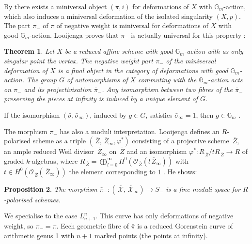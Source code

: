 \documentclass[12pt,a4paper]{amsart}  %
\newcommand{\G}{\mathbb{G}}
\newcommand{\vp}{\varphi}
\newcommand{\olsi}[1]{\,\overline{\!{#1}}}
\newtheorem{thm}{Theorem}[section]
\newtheorem{prop}[thm]{Proposition}
\theoremstyle{definition}
\theoremstyle{remark}
\begin{document}
 By \cite{Pi2} there exists a miniversal object
 $(\pi,i)$ for deformations of $X$ with  $\G_m$-action, which also induces
 a miniversal deformation of the isolated singularity $(X,p)$. The part $\pi_-$
of $\pi$ of negative weight is miniversal for deformations of $X$
with good  $\G_m$-action. Looijenga proves that $\pi_-$
is actually universal for this property \cite[Thm A.2]{Lo}:

\begin{thm}
Let $X$ be a reduced affine scheme with good $\G_m$-action with as only singular point
the vertex. The negative weight part $\pi_-$ of the miniversal deformation of $X$
is a final object in the category of deformations with good $\G_m$-action. The group 
$G$ of automorphisms of $X$ commuting with the  $\G_m$-action acts on  $\pi_-$ 
and its  projectivisation $\bar{\pi}_-$. Any isomorphism between 
two fibres of the $\bar{\pi}_-$ preserving  the
pieces  at  infinity is induced by a unique element of $G$.
\end{thm}

If the isomorphism $(\bar\sigma, \bar\sigma_\infty)$, induced by $g\in G$,
satisfies $\bar\sigma_\infty=1$, then $g\in \G_m$ \cite[Lemma A.4]{Lo}.


The morphism $\bar\pi_-$ has also a moduli interpretation. Looijenga defines an $R$-polarised
scheme as a triple $(\olsi Z, \olsi Z_\infty,\vp^*)$ consisting of a projective scheme
$\olsi Z$, an ample reduced Weil divisor $\olsi Z_\infty$ on $\olsi Z$ and an isomorphism
$\vp^*\colon R_{\olsi Z}/t  R_{\olsi Z} \to R$ of graded $k$-algebras, where
$R_{\olsi Z} =\bigoplus_{l=0}^\infty H^0(\mathcal O_{\olsi Z}(l \olsi Z_\infty))$ with 
$t\in  H^0(\mathcal O_{\olsi Z}(\olsi Z_\infty))$ the element corresponding to $1$ \cite[A.5]{Lo}.
He shows:

\begin{prop}
The morphism 
$\bar{\pi}_-\colon (\olsi {\mathcal X},\olsi{\mathcal X}_\infty)\to S_-$
is a fine moduli space for $R$-polarised schemes.
\end{prop}

We specialise to the case  $L_{n+1}^n$. This curve has only deformations of negative weight, so
 $\pi_-=\pi$. Eech  geometric fibre
of $\bar{\pi}$  is a reduced  Gorenstein curve of arithmetic genus
1 with $n+1$ marked points (the points at infinity). 
\end{document}

